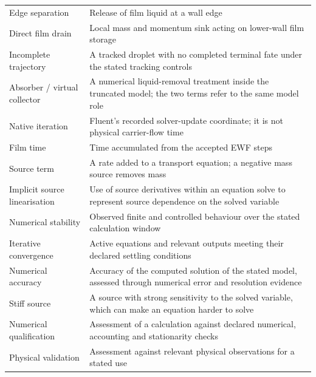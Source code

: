 \documentclass[12pt]{article}
\begin{document}
{\begin{longtable}[]{@{}
  >{\raggedright\arraybackslash}p{}
  >{\raggedright\arraybackslash}p{}@{}}
Edge separation & Release of film liquid at a wall edge \\
Direct film drain & Local mass and momentum sink acting on lower-wall film storage \\
Incomplete trajectory & A tracked droplet with no completed terminal fate under the stated tracking controls \\
Absorber / virtual collector & A numerical liquid-removal treatment inside the truncated model; the two terms refer to the same model role \\
Native iteration & Fluent's recorded solver-update coordinate; it is not physical carrier-flow time \\
Film time & Time accumulated from the accepted EWF steps \\
Source term & A rate added to a transport equation; a negative mass source removes mass \\
Implicit source linearisation & Use of source derivatives within an equation solve to represent source dependence on the solved variable \\
Numerical stability & Observed finite and controlled behaviour over the stated calculation window \\
Iterative convergence & Active equations and relevant outputs meeting their declared settling conditions \\
Numerical accuracy & Accuracy of the computed solution of the stated model, assessed through numerical error and resolution evidence \\
Stiff source & A source with strong sensitivity to the solved variable, which can make an equation harder to solve \\
Numerical qualification & Assessment of a calculation against declared numerical, accounting and stationarity checks \\
Physical validation & Assessment against relevant physical observations for a stated use \\
\end{longtable}
}
\endgroup

\clearpage
\end{document}
